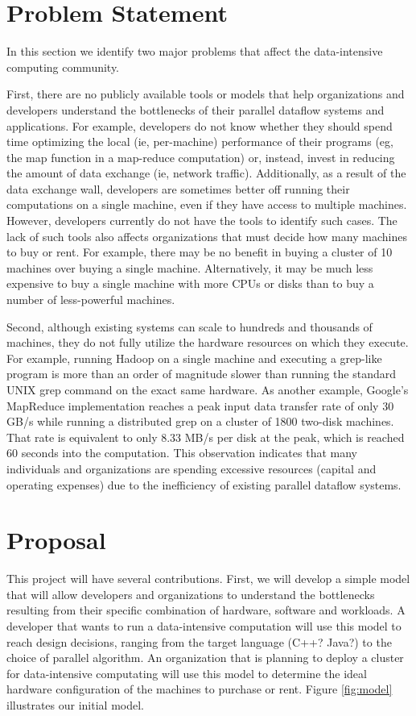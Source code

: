 \documentclass{acm_proc_article-sp}
\begin{document}
\section{Problem Statement}
In this section we identify two major problems that affect the data-intensive computing community.

First, there are no publicly available tools or models that help organizations and developers understand the bottlenecks of their parallel dataflow systems and applications. For example, developers do not know whether they should spend time optimizing the local (ie, per-machine) performance of their programs (eg, the map function in a map-reduce computation) or, instead, invest in reducing the amount of data exchange (ie, network traffic). Additionally, as a result of the data exchange wall, developers are sometimes better off running their computations on a single machine, even if they have access to multiple machines. However, developers currently do not have the tools to identify such cases. The lack of such tools also affects organizations that must decide how many machines to buy or rent. For example, there may be no benefit in buying a cluster of 10 machines over buying a single machine. Alternatively, it may be much less expensive to buy a single machine with more CPUs or disks than to buy a number of less-powerful machines.

Second, although existing systems can scale to hundreds and thousands of machines, they do not fully utilize the hardware resources on which they execute. For example, running Hadoop on a single machine and executing a grep-like program is more than an order of magnitude slower than running the standard UNIX grep command on the exact same hardware. As another example, Google's MapReduce implementation reaches a peak input data transfer rate of only 30 GB/s while running a distributed grep on a cluster of 1800 two-disk machines. That rate is equivalent to only 8.33 MB/s per disk at the peak, which is reached 60 seconds into the computation. This observation indicates that many individuals and organizations are spending excessive resources (capital and operating expenses) due to the inefficiency of existing parallel dataflow systems.

\section{Proposal}
This project will have several contributions. First, we will develop a simple model that will allow developers and organizations to understand the bottlenecks resulting from their specific combination of hardware, software and workloads. A developer that wants to run a data-intensive computation will use this model to reach design decisions, ranging from the target language (C++? Java?) to the choice of parallel algorithm. An organization that is planning to deploy a cluster for data-intensive computating will use this model to determine the ideal hardware configuration of the machines to purchase or rent. Figure \ref{fig:model} illustrates our initial model.
\end{document}
